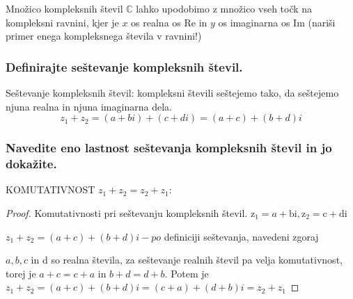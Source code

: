 \documentclass{article}
\begin{document}
Množico kompleksnih števil $\mathbb{C}$ lahko upodobimo z množico vseh točk na kompleksni ravnini, kjer je $x$ os realna os Re in $y$ os imaginarna os Im (nariši primer enega kompleksnega števila v ravnini!)
\begin{center}
\end{center}

\subsubsection*{Definirajte seštevanje kompleksnih števil.}
Seštevanje kompleksnih števil: kompleksni števili seštejemo tako, da seštejemo njuna realna in njuna imaginarna dela.
\begin{equation*}
    z_{1}+z_{2}=(a+b i)+(c+d i)=(a+c)+(b+d) i
\end{equation*}


\subsubsection*{Navedite eno lastnost seštevanja kompleksnih števil in jo dokažite.}
KOMUTATIVNOST $z_{1}+z_{2}=z_{2}+z_{1}$:
\begin{proof}
    Komutativnosti pri seštevanju kompleksnih števil.
    $\mathrm{z}_{1}=a+\mathrm{bi}, \mathrm{z}_{2}=\mathrm{c}+\mathrm{di}$

$z_{1}+z_{2}=(a+c)+(b+d) i-p o$ definiciji seštevanja, navedeni zgoraj

$a, b, c$ in d so realna števila, za seštevanje realnih števil pa velja komutativnost, torej je $a+c=c+a$ in $b+d=d+b$. Potem je $z_{1}+z_{2}=(a+c)+(b+d) i=(c+a)+(d+b) i=z_{2}+z_{1}$
\end{proof}
 
\end{document}
